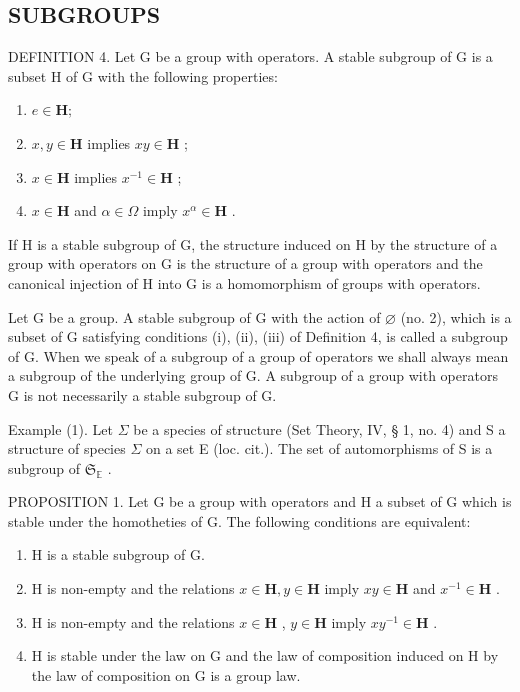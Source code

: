 \subsection{SUBGROUPS}

DEFINITION 4. Let G be a group with operators. A stable subgroup of G is a subset H of G with the following properties:

\begin{enumerate}
\def\labelenumi{(\roman{enumi})}
\item
  \(e\in \mathbf{H};\)
\item
  \(x, y \in \mathbf{H}\) implies \(xy \in \mathbf{H}\) ;
\item
  \(x \in \mathbf{H}\) implies \(x^{-1} \in \mathbf{H}\) ;
\item
  \(x \in \mathbf{H}\) and \(\alpha \in \Omega\) imply \(x^{\alpha} \in \mathbf{H}\) .
\end{enumerate}

If H is a stable subgroup of G, the structure induced on H by the structure of a group with operators on G is the structure of a group with operators and the canonical injection of H into G is a homomorphism of groups with operators.

Let G be a group. A stable subgroup of G with the action of \(\varnothing\) (no. 2), which is a subset of G satisfying conditions (i), (ii), (iii) of Definition 4, is called a subgroup of G. When we speak of a subgroup of a group of operators we shall always mean a subgroup of the underlying group of G. A subgroup of a group with operators G is not necessarily a stable subgroup of G.

Example (1). Let \(\Sigma\) be a species of structure (Set Theory, IV, § 1, no. 4) and S a structure of species \(\Sigma\) on a set E (loc. cit.). The set of automorphisms of S is a subgroup of \(\mathfrak{S}_{\mathbb{E}}\) .

PROPOSITION 1. Let G be a group with operators and H a subset of G which is stable under the homotheties of G. The following conditions are equivalent:

\begin{enumerate}
\def\labelenumi{(\alph{enumi})}
\item
  H is a stable subgroup of G.
\item
  H is non-empty and the relations \(x \in \mathbf{H}, y \in \mathbf{H}\) imply \(xy \in \mathbf{H}\) and \(x^{-1} \in \mathbf{H}\) .
\item
  H is non-empty and the relations \(x \in \mathbf{H}\) , \(y \in \mathbf{H}\) imply \(xy^{-1} \in \mathbf{H}\) .
\item
  H is stable under the law on G and the law of composition induced on H by the law of composition on G is a group law.
\end{enumerate}


